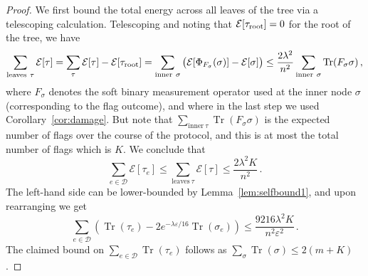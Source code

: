 \documentclass[10pt]{article}
\renewcommand{\epsilon}{\varepsilon}
\newcommand{\energy}{\mathcal{E}}
\newcommand{\luders}{\Phi}
\DeclareMathOperator{\Tr}{Tr}
\begin{document}
\begin{proof}
    We first bound the total energy across all leaves of the tree via a telescoping calculation.
    Telescoping and noting that $\energy[\tau_{\rm root}] = 0$ for the root of the tree, we have
    \begin{equation}
        \sum_{\mathrm{leaves} \ \tau} \energy[\tau] = \sum_{\tau} \energy[\tau] - \energy[\tau_{\rm root}] = \sum_{\mathrm{inner} \ \sigma} \big(\energy[\luders_{F_\sigma}(\sigma)] - \energy[\sigma]\big) \le \frac{2\lambda^2}{n^2} \sum_{\mathrm{inner} \ \sigma}  \Tr(F_{\sigma}\sigma)\,,
    \end{equation}
    where $F_\sigma$ denotes the soft binary measurement operator used at the inner node $\sigma$ (corresponding to the flag outcome), and where in the last step we used Corollary~\ref{cor:damage}. But note that $\sum_{\mathrm{inner} \ \tau} \Tr(F_\sigma\sigma)$ is the expected number of flags over the course of the protocol, and this is at most the total number of flags which is $K$. We conclude that
    \begin{equation}
        \sum_{e\in\mathcal{D}} \energy[\tau_e] \le \sum_{\mathrm{leaves} \ \tau} \energy[\tau] \le \frac{2\lambda^2 K}{n^2}\,.\label{eq:highexcite_part}
   \end{equation}
    The left-hand side can be lower-bounded by Lemma~\ref{lem:selfbound1}, and upon rearranging we get
    \begin{equation}
        \sum_{e\in\mathcal{D}} (\Tr(\tau_e)- 2 e^{-\lambda\epsilon/16}\Tr(\sigma_e)) \le \frac{9216\lambda^2 K}{n^2\epsilon^2}\,.
    \end{equation}
    The claimed bound on $\sum_{e \in \mathcal{D}}\Tr(\tau_e)$ follows as $\sum_\sigma \Tr(\sigma) \le 2(m+K)$.
\end{proof}


\end{document}
